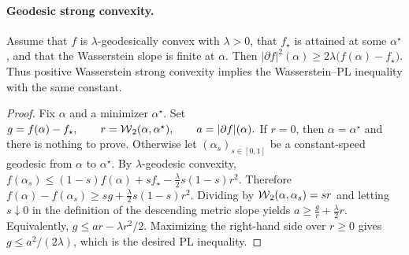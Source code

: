 \paragraph{Geodesic strong convexity.}
\begin{prop}\label{prop-strong-geodesic-convexity-implies-pl}
Assume that \(f\) is \(\lambda\)-geodesically convex with \(\lambda>0\), that \(f_\star\) is attained at some \(\alpha^\star\), and that the Wasserstein slope is finite at \(\alpha\). Then
\(|\partial f|^2(\alpha) \geq 2\lambda\bigl(f(\alpha)-f_\star\bigr).\)
Thus positive Wasserstein strong convexity implies the Wasserstein--PL inequality with the same constant.
\end{prop}
\begin{proof}
Fix \(\alpha\) and a minimizer \(\alpha^\star\). Set
\(g=f(\alpha)-f_\star,\qquad r=\operatorname{\mathcal{W}}_2(\alpha,\alpha^\star),\qquad a=|\partial f|(\alpha).\)
If \(r=0\), then \(\alpha=\alpha^\star\) and there is nothing to prove. Otherwise let \((\alpha_s)_{s\in[0,1]}\) be a constant-speed geodesic from \(\alpha\) to \(\alpha^\star\). By \(\lambda\)-geodesic convexity,
\(f(\alpha_s) \leq (1-s)f(\alpha)+s f_\star -\frac{\lambda}{2}s(1-s)r^2.\)
Therefore
\(f(\alpha)-f(\alpha_s) \geq s g+\frac{\lambda}{2}s(1-s)r^2.\)
Dividing by \(\operatorname{\mathcal{W}}_2(\alpha,\alpha_s)=sr\) and letting \(s\downarrow0\) in the definition of the descending metric slope yields
\(a\geq \frac{g}{r}+\frac{\lambda}{2}r\).
Equivalently, \(g\leq ar-\lambda r^2/2\). Maximizing the right-hand side over \(r\geq0\) gives \(g\leq a^2/(2\lambda)\), which is the desired PL inequality.
\end{proof}
